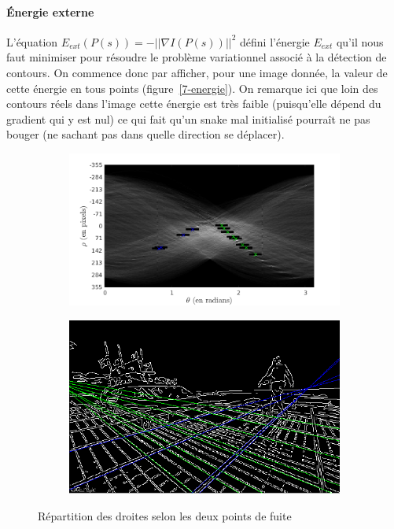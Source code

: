 \documentclass{article}
\begin{document}
\paragraph{Énergie externe}
L'équation $E_{ext}(P(s)) = - ||\nabla I(P(s))||^2$ défini l'énergie $E_{ext}$ qu'il nous faut minimiser pour résoudre le problème variationnel associé à la détection de contours. On commence donc par afficher, pour une image donnée, la valeur de cette énergie en tous points (figure~\ref{7-energie}). On remarque ici que loin des contours réels dans l'image cette énergie est très faible (puisqu'elle dépend du gradient qui y est nul) ce qui fait qu'un snake mal initialisé pourraît ne pas bouger (ne sachant pas dans quelle direction se déplacer).
\begin{figure}[!ht]
    \centering
    \begin{subfigure}[c]{0.32\linewidth}
        \centering
        \includegraphics[width=\linewidth]{images/5-C_repartition.png}
    \end{subfigure}
    \hfill
    \begin{subfigure}[c]{0.32\linewidth}
        \centering
        \includegraphics[width=\linewidth]{images/5-lines_repartition.png}
    \end{subfigure}
    \caption{Répartition des droites selon les deux points de fuite}
    \label{5-T-grand}
\end{figure}
\end{document}
